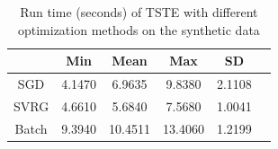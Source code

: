 \documentclass[letterpaper]{article}
\begin{document}
		\begin{table}[ht]
			\centering
			\begin{tabular}{c||c c c c c }
				\hline
						& Min 	 & Mean 	& Max 		& SD 		\\ \hline \hline
				SGD 	& 4.1470 & 6.9635 	& 9.8380 	& 2.1108 	\\    \hline
				SVRG 	& 4.6610 & 5.6840 	& 7.5680 	& 1.0041 	\\    \hline
				Batch 	& 9.3940 & 10.4511 	& 13.4060 	& 1.2199 	\\    \hline
			\end{tabular}
			\caption{{Run time (seconds) of TSTE with different optimization methods on the synthetic data}}\label{tab_3}
		\end{table}
\end{document}
